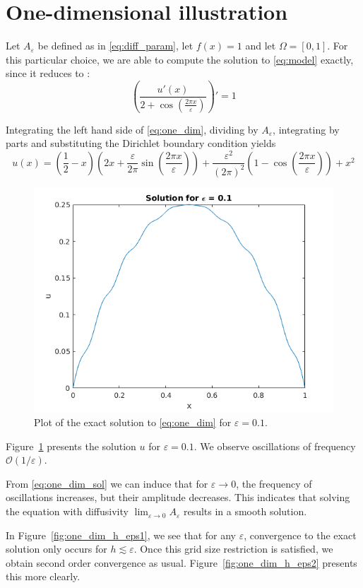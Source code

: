 \documentclass{article}
\renewcommand{\epsilon}{\varepsilon}
\newcommand{\bigo}[1]{\mathcal{O}\left(#1\right)}
\begin{document}
\section{One-dimensional illustration}
\label{sec:onedim}
Let $A_\epsilon$ be defined as in \eqref{eq:diff_param}, let $f(x) = 1$ and let $\Omega = [0,1]$. For this particular choice, we are able to compute the solution to \eqref{eq:model} exactly, since it reduces to :
\begin{equation}
    \left( \frac{u'(x)}{2+\cos \left( \frac{2\pi x}{\epsilon} \right)} \right)' = 1
    \label{eq:one_dim}
\end{equation}

Integrating the left hand side of \eqref{eq:one_dim}, dividing by $A_\epsilon$, integrating by parts and substituting the Dirichlet boundary condition yields
\begin{equation}
    u(x) = \left( \frac{1}{2} - x \right) \left(2x + \frac{\epsilon}{2\pi}\sin\left(\frac{2\pi x}{\epsilon}\right) \right) + \frac{\epsilon^2}{(2\pi)^2}\left( 1 - \cos \left( \frac{2\pi x}{\epsilon} \right) \right) + x^2
   \label{eq:one_dim_sol}
\end{equation}

\begin{figure}[th]
    \centering
    \includegraphics[width=0.5\linewidth]{one_dim_exact.png}
    \caption{Plot of the exact solution to \eqref{eq:one_dim} for $\epsilon=0.1$.}
    \label{fig:one_dim_exact}
\end{figure}

Figure~\ref{fig:one_dim_exact} presents the solution $u$ for $\epsilon = 0.1$. We observe oscillations of frequency $\bigo{1/\epsilon}$.

From \eqref{eq:one_dim_sol} we can induce that for $\epsilon \to 0$, the frequency of oscillations increases, but their amplitude decreases. This indicates that solving the equation with diffusivity $\lim_{\epsilon\to 0}A_\epsilon$ results in a smooth solution.

In Figure~\ref{fig:one_dim_h_eps1}, we see that for any $\epsilon$, convergence to the exact solution only occurs for $h \lesssim \epsilon$. Once this grid size restriction is satisfied, we obtain second order convergence as usual. Figure~\ref{fig:one_dim_h_eps2} presents this more clearly.
\end{document}
